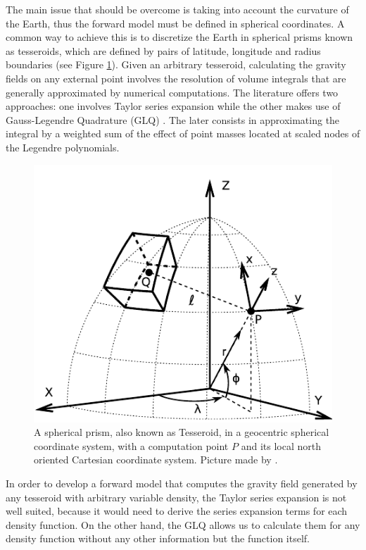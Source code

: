 \documentclass[extra]{gji}
\begin{document}
The main issue that should be overcome is taking into account the curvature of the Earth, thus the forward model must be defined in spherical coordinates.
A common way to achieve this is to discretize the Earth in spherical prisms known as tesseroids, which are defined by pairs of latitude, longitude and radius boundaries (see Figure \ref{fig:tesseroid-uieda}).
Given an arbitrary tesseroid, calculating the gravity fields on any external point involves the resolution of volume integrals that are generally approximated by numerical computations.
The literature offers two approaches: one involves Taylor series expansion \citep{Heck2007, Grombein2013} while the other makes use of Gauss-Legendre Quadrature (GLQ) \citep{Asgharzadeh2007, Uieda2016, Uieda2017}. The later consists in approximating the integral by a weighted sum of the effect of point masses located at scaled nodes of the Legendre polynomials.

\begin{figure}
\centering
\includegraphics[width=0.9\linewidth]{figures/tesseroid-uieda.pdf}
\caption{
A spherical prism, also known as  Tesseroid, in a geocentric spherical coordinate system, with a computation point $P$ and its local north oriented Cartesian coordinate system. Picture made by \citep{Uieda2015}.
}
\label{fig:tesseroid-uieda}
\end{figure}

In order to develop a forward model that computes the gravity field generated by any tesseroid with arbitrary variable density, the Taylor series expansion is not well suited, because it would need to derive the series expansion terms for each density function. On the other hand, the GLQ allows us to calculate them for any density function without any other information but the function itself.
\end{document}
